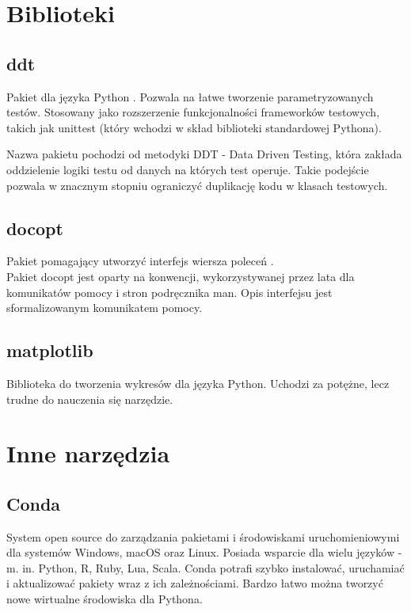 \section{Biblioteki}
\subsection{ddt}
\label{DdtOpis}
Pakiet dla języka Python \cite{ddt:documentation}. Pozwala na łatwe tworzenie parametryzowanych testów. Stosowany jako rozszerzenie funkcjonalności frameworków testowych, takich jak unittest (który wchodzi w skład biblioteki standardowej Pythona).

Nazwa pakietu pochodzi od metodyki DDT - Data Driven Testing, która zakłada oddzielenie logiki testu od danych na których test operuje. Takie podejście pozwala w znacznym stopniu ograniczyć duplikację kodu w klasach testowych.
\subsection{docopt}
\label{docoptOpis}
Pakiet pomagający utworzyć interfejs wiersza poleceń \cite{docopt:documentation}. \\
Pakiet docopt jest oparty na konwencji, wykorzystywanej przez lata dla komunikatów pomocy i stron podręcznika man. Opis interfejsu jest sformalizowanym komunikatem pomocy.
\subsection{matplotlib}
\label{matplotlibDescription}
Biblioteka do tworzenia wykresów dla języka Python. Uchodzi za potężne, lecz trudne do nauczenia się narzędzie.
\section{Inne narzędzia}
\subsection{Conda}
System open source do zarządzania pakietami i środowiskami uruchomieniowymi dla systemów Windows, macOS oraz Linux. Posiada wsparcie dla wielu języków - m. in. Python, R, Ruby, Lua, Scala.\cite{conda:documentation}
Conda potrafi szybko instalować, uruchamiać i aktualizować pakiety wraz z ich zależnościami.
Bardzo łatwo można tworzyć nowe wirtualne środowiska dla Pythona.

